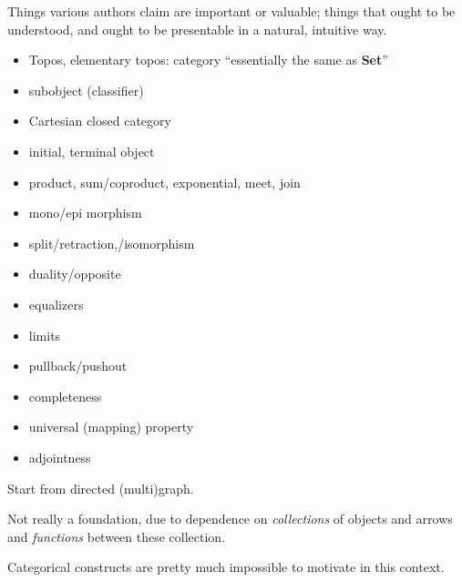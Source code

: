 \documentclass[11pt,openany]{article}
\begin{document}
\setcounter{currentlevel}{\value{baseSectionLevel}}
\label{sec:Key-ideas}

Things various authors claim are important or valuable;
things that ought to be understood,
and ought to be presentable in a natural, intuitive way.

\begin{itemize}
  \item Topos, elementary topos: 
  category ``essentially the same as \textbf{Set}''
  \item subobject (classifier)
  \item Cartesian closed category
  \item initial, terminal object
  \item product, sum/coproduct, exponential, meet, join
  \item mono/epi morphism
  \item split/retraction,/isomorphism
  \item duality/opposite
  \item equalizers
  \item limits
  \item pullback/pushout
  \item completeness
  \item universal (mapping) property
  \item adjointness
\end{itemize}
\setcounter{currentlevel}{\value{baseSectionLevel}}
\label{sec:Bottom-up}

Start from directed (multi)graph.


Not really a foundation, due to 
dependence on \textit{collections} of objects and arrows
and \textit{functions} between these collection. 

Categorical constructs are pretty much impossible to motivate
in this context.

\setcounter{currentlevel}{\value{baseSectionLevel}}
\label{sec:Topos-down}
 
\end{document}
